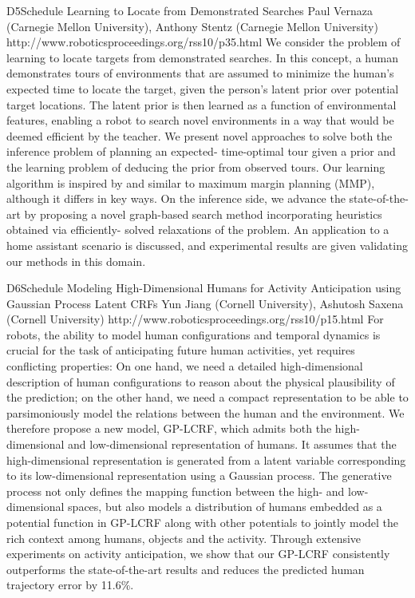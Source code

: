 \begin{spacing}{1.0}
\clearpage
\descriptionPaper
{D5}{Schedule}
{	
Learning to Locate from Demonstrated Searches 
}
{
Paul Vernaza (Carnegie Mellon University), Anthony Stentz (Carnegie Mellon University)
}
{
http://www.roboticsproceedings.org/rss10/p35.html
}
{
We consider the problem of learning to locate targets from demonstrated searches. In this concept, a human demonstrates tours of environments that are assumed to minimize the human’s expected time to locate the target, given the person’s latent prior over potential target locations. The latent prior is then learned as a function of environmental features, enabling a robot to search novel environments in a way that would be deemed efficient by the teacher. We present novel approaches to solve both the inference problem of planning an expected- time-optimal tour given a prior and the learning problem of deducing the prior from observed tours. Our learning algorithm is inspired by and similar to maximum margin planning (MMP), although it differs in key ways. On the inference side, we advance the state-of-the-art by proposing a novel graph-based search method incorporating heuristics obtained via efficiently- solved relaxations of the problem. An application to a home assistant scenario is discussed, and experimental results are given validating our methods in this domain.
}



\descriptionPaper
{D6}{Schedule}
{	
Modeling High-Dimensional Humans for Activity Anticipation using Gaussian Process Latent CRFs
}
{
Yun Jiang (Cornell University), Ashutosh Saxena (Cornell University)
}
{
http://www.roboticsproceedings.org/rss10/p15.html
}
{
For robots, the ability to model human configurations and temporal dynamics is crucial for the task of anticipating future human activities, yet requires conflicting properties: On one hand, we need a detailed high-dimensional description of human configurations to reason about the physical plausibility of the prediction; on the other hand, we need a compact representation to be able to parsimoniously model the relations between the human and the environment. We therefore propose a new model, GP-LCRF, which admits both the high-dimensional and low-dimensional representation of humans. It assumes that the high-dimensional representation is generated from a latent variable corresponding to its low-dimensional representation using a Gaussian process. The generative process not only defines the mapping function between the high- and low-dimensional spaces, but also models a distribution of humans embedded as a potential function in GP-LCRF along with other potentials to jointly model the rich context among humans, objects and the activity. Through extensive experiments on activity anticipation, we show that our GP-LCRF consistently outperforms the state-of-the-art results and reduces the predicted human trajectory error by 11.6\%.
}




\end{spacing}
